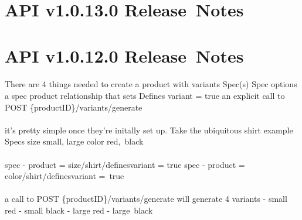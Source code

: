 \documentclass{memoir}%
\begin{document}
%
\section*{API v1.0.13.0 Release~Notes}%
\paragraph*{}%

%
\section*{API v1.0.12.0 Release~Notes}%
\paragraph*{}%

%
\paragraph*{}%
There are 4 things needed to create a product with variants\newline%
Spec(s)\newline%
Spec options\newline%
a spec product relationship that sets Defines variant = true\newline%
an explicit call to \newline%
POST \{productID\}/variants/generate

%
\paragraph*{}%
it’s pretty simple once they’re initally set up. Take the ubiquitous shirt example\newline%
Specs \newline%
size small, large\newline%
color red,~black

%
\paragraph*{}%
spec {-} product = size/shirt/definesvariant = true\newline%
spec {-} product = color/shirt/definesvariant =~true

%
\paragraph*{}%
a call to POST\newline%
\{productID\}/variants/generate\newline%
will generate 4 variants\newline%
{-} small red\newline%
{-} small black\newline%
{-} large red\newline%
{-} large~black
\end{document}

